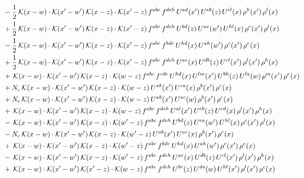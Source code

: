 \documentclass[9pt]{article}
\numberwithin{equation}{section}
\begin{document}
\begin{align}
& -\frac{1}{2}\,\mathcal{K}(x-w)\cdot\mathcal{K}(x'-w')\,\mathcal{K}(x-z)\cdot\mathcal{K}(x'-z)\,f^{abc}\,f^{deh}\,U^{ad}(x')\,U^{eb}(z)\,U^{cl}(x)\,\rho^{h}(x')\,\rho^{l}(x)\notag\\
& +\frac{1}{2}\,\mathcal{K}(x-w)\cdot\mathcal{K}(x'-w')\,\mathcal{K}(x-z)\cdot\mathcal{K}(x'-z)\,f^{abc}\,f^{deh}\,U^{bd}(z)\,U^{ae}(w')\,U^{hl}(x)\,\rho^{c}(x')\,\rho^{l}(x)\notag\\
& -\frac{1}{2}\,\mathcal{K}(x-w)\cdot\mathcal{K}(x'-w')\,\mathcal{K}(x-z)\cdot\mathcal{K}(x'-z)\,f^{abc}\,f^{bde}\,U^{hd}(x)\,U^{ah}(w')\,\rho^{c}(x')\,\rho^{e}(x)\notag\\
& +\frac{1}{2}\,\mathcal{K}(x-w)\cdot\mathcal{K}(x'-w')\,\mathcal{K}(x-z)\cdot\mathcal{K}(x'-z)\,f^{abc}\,f^{deh}\,U^{ae}(x)\,U^{db}(z)\,U^{cl}(x')\,\rho^{l}(x')\,\rho^{h}(x)\notag\\
& +\,\mathcal{K}(x-w)\cdot\mathcal{K}(x'-w')\,\mathcal{K}(x-z)\cdot\mathcal{K}(w-z)\,f^{abc}\,f^{cde}\,U^{hd}(x)\,U^{lm}(x')\,U^{bh}(z)\,U^{la}(w)\,\rho^{m}(x')\,\rho^{e}(x)\notag\\
& +N_{c}\,\mathcal{K}(x-w)\cdot\mathcal{K}(x'-w')\,\mathcal{K}(x-z)\cdot\mathcal{K}(w-z)\,U^{ab}(x')\,U^{ca}(x)\,\rho^{b}(x')\,\rho^{c}(x)\notag\\
& +N_{c}\,\mathcal{K}(x-w)\cdot\mathcal{K}(x'-w')\,\mathcal{K}(x-z)\cdot\mathcal{K}(w-z)\,U^{ab}(x')\,U^{ac}(w)\,\rho^{b}(x')\,\rho^{c}(x)\notag\\
& +\,\mathcal{K}(x-w)\cdot\mathcal{K}(x'-w')\,\mathcal{K}(x-z)\cdot\mathcal{K}(w-z)\,f^{abc}\,f^{deh}\,U^{al}(x')\,U^{eb}(z)\,U^{cd}(x)\,\rho^{l}(x')\,\rho^{h}(x)\notag\\
& -\,\mathcal{K}(x-w)\cdot\mathcal{K}(x'-w')\,\mathcal{K}(x-z)\cdot\mathcal{K}(w'-z)\,f^{abc}\,f^{deh}\,U^{bd}(z)\,U^{ea}(w')\,U^{hl}(x)\,\rho^{c}(x')\,\rho^{l}(x)\notag\\
& -N_{c}\,\mathcal{K}(x-w)\cdot\mathcal{K}(x'-w')\,\mathcal{K}(x-z)\cdot\mathcal{K}(w'-z)\,U^{ab}(x')\,U^{ac}(x)\,\rho^{b}(x')\,\rho^{c}(x)\notag\\
& +\,\mathcal{K}(x-w)\cdot\mathcal{K}(x'-w')\,\mathcal{K}(x-z)\cdot\mathcal{K}(w'-z)\,f^{abc}\,f^{bde}\,U^{hd}(x)\,U^{ah}(w')\,\rho^{c}(x')\,\rho^{e}(x)\notag\\
& -\,\mathcal{K}(x-w)\cdot\mathcal{K}(x'-w')\,\mathcal{K}(x-z)\cdot\mathcal{K}(w'-z)\,f^{abc}\,f^{deh}\,U^{ae}(x)\,U^{db}(z)\,U^{cl}(x')\,\rho^{l}(x')\,\rho^{h}(x)\notag\\
& +\,\mathcal{K}(x-w)\cdot\mathcal{K}(x'-w')\,\mathcal{K}(x'-z)\cdot\mathcal{K}(w-z)\,f^{abc}\,f^{deh}\,U^{be}(z)\,U^{da}(w)\,U^{hl}(x')\,\rho^{l}(x')\,\rho^{c}(x)\notag\\

\end{align}
\end{document}
